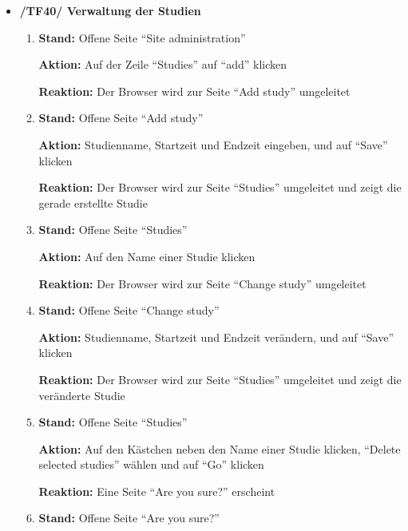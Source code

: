 \documentclass[a4paper]{scrreprt}
\begin{document}
\begin{itemize}
                \item \textbf{/TF40/ Verwaltung der Studien}
                    \begin{enumerate}
                        \item \par \textbf{Stand: }Offene Seite ``Site administration''
                              \par \textbf{Aktion: }Auf der Zeile ``Studies'' auf ``add'' klicken
                              \par \textbf{Reaktion: }Der Browser wird zur Seite ``Add study'' umgeleitet
                        \item \par \textbf{Stand: }Offene Seite ``Add study''
                              \par \textbf{Aktion: }Studienname, Startzeit und Endzeit eingeben, und auf ``Save'' klicken
                              \par \textbf{Reaktion: }Der Browser wird zur Seite ``Studies'' umgeleitet und zeigt die gerade erstellte Studie
                        \item \par \textbf{Stand: }Offene Seite ``Studies''
                              \par \textbf{Aktion: }Auf den Name einer Studie klicken
                              \par \textbf{Reaktion: }Der Browser wird zur Seite ``Change study'' umgeleitet  
                        \item \par \textbf{Stand: }Offene Seite ``Change study''
                              \par \textbf{Aktion: }Studienname, Startzeit und Endzeit ver\"andern, und auf ``Save'' klicken
                              \par \textbf{Reaktion: }Der Browser wird zur Seite ``Studies'' umgeleitet und zeigt die ver\"anderte Studie 
                        \item \par \textbf{Stand: }Offene Seite ``Studies''
                              \par \textbf{Aktion: }Auf den K\"astchen neben den Name einer Studie klicken, ``Delete selected studies'' w\"ahlen und auf ``Go'' klicken
                              \par \textbf{Reaktion: }Eine Seite ``Are you sure?'' erscheint 
						\item \par \textbf{Stand: }Offene Seite ``Are you sure?''

\end{enumerate}
\end{itemize}
\end{document}
